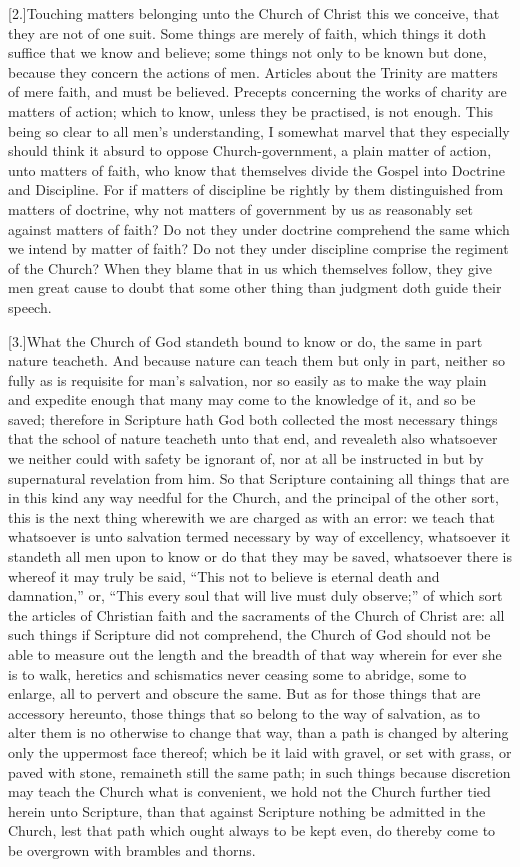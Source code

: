 [2.]Touching matters belonging unto the Church of Christ this we conceive, that they are not of one suit. Some things are merely of faith, which things it doth suffice that we know and believe; some things not only to be known but done, because they concern the actions of men. Articles about the Trinity are matters of mere faith, and must be believed. Precepts concerning the works of charity are matters of action; which to know, unless they be practised, is not enough. This being so clear to all men’s understanding, I somewhat marvel that they especially should think it absurd to oppose Church-government, a plain matter of action, unto matters of faith, who know that themselves divide the Gospel into Doctrine and Discipline. For if matters of discipline be rightly by them distinguished from matters of doctrine, why not matters of government by us as reasonably set against matters of faith? Do not they under doctrine comprehend the same which we intend by matter of faith? Do not they under discipline comprise the regiment of the Church? When they blame that in us which themselves follow, they give men great cause to doubt that some other thing than judgment doth guide their speech.

[3.]What the Church of God standeth bound to know or do, the same in part nature teacheth. And because nature can teach them but only in part, neither so fully as is requisite for man’s salvation, nor so easily as to make the way plain and expedite enough that many may come to the knowledge  of it, and so be saved; therefore in Scripture hath God both collected the most necessary things that the school of nature teacheth unto that end, and revealeth also whatsoever we neither could with safety be ignorant of, nor at all be instructed in but by supernatural revelation from him. So that Scripture containing all things that are in this kind any way needful for the Church, and the principal of the other sort, this is the next thing wherewith we are charged as with an error: we teach that whatsoever is unto salvation termed necessary by way of excellency, whatsoever it standeth all men upon to know or do that they may be saved, whatsoever there is whereof it may truly be said, “This not to believe is eternal death and damnation,” or, “This every soul that will live must duly observe;” of which sort the articles of Christian faith and the sacraments of the Church of Christ are: all such things if Scripture did not comprehend, the Church of God should not be able to measure out the length and the breadth of that way wherein for ever she is to walk, heretics and schismatics never ceasing some to abridge, some to enlarge, all to pervert and obscure the same. But as for those things that are accessory hereunto, those things that so belong to the way of salvation, as to alter them is no otherwise to change that way, than a path is changed by altering only the uppermost face thereof; which be it laid with gravel, or set with grass, or paved with stone, remaineth still the same path; in such things because discretion may teach the Church what is convenient, we hold not the Church further tied herein unto Scripture, than that against Scripture nothing be admitted in the Church, lest that path which ought always to be kept even, do thereby come to be overgrown with brambles and thorns.

